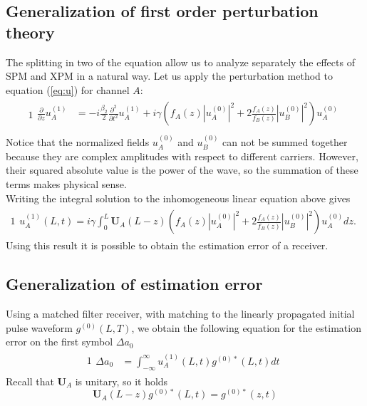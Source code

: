 \documentclass[10pt, lettersize, journal, onecolumn]{IEEEtran}
\begin{document}
\subsection{Generalization of first order perturbation theory}
The splitting in two of the equation allow us to analyze separately the effects of SPM and XPM in a natural way.
Let us apply the perturbation method to equation  (\ref{eq:u}) for channel $A$:
\begin{alignat}{1}
 \begin{aligned}
 \frac{\partial}{\partial z} u_A^{(1)} &= -  i \frac{\beta_2}{2} \frac{\partial^2}{\partial t^2} u_A^{(1)} + i \gamma \left(f_A(z)|u_A^{(0)}|^2 + 2 \frac{f_A(z)}{f_B(z)} |u_B^{(0)}|^2 \right)u_A^{(0)} \\
 \end{aligned}
\end{alignat} \label{eq:perturbation}
Notice that the normalized fields $u^{(0)}_A$ and $u^{(0)}_B$ can not be summed together because they are complex amplitudes with respect to different carriers. However, their squared absolute value is the power of the wave, so the summation of these terms makes physical sense.\\
Writing the integral solution to the inhomogeneous linear equation above gives
\begin{alignat}{1}
 \begin{aligned}
 u_A^{(1)}(L, t) = i\gamma \int_0^L \mathbf{U}_A(L-z)\left(f_A(z)|u_A^{(0)}|^2 + 2 \frac{f_A(z)}{f_B(z)} |u_B^{(0)}|^2 \right)u_A^{(0)} dz.
 \end{aligned}\label{eq:solution}
\end{alignat} 
Using this result it is possible to obtain the estimation error of a receiver.
\subsection{Generalization of estimation error}
Using a matched filter receiver, with matching to the linearly propagated initial pulse waveform $g^{(0)}(L, T)$, we obtain the following equation for the estimation error on the first symbol $\Delta a_0$ 
\begin{alignat}{1}
 \begin{aligned}
 \Delta a_0 &= \int_{-\infty}^{\infty} u_A^{(1)}(L, t) g^{(0)*}(L, t) dt
 \end{aligned}
\end{alignat} \label{eq:matched}
Recall that $\mathbf{U}_A$ is unitary, so it holds
\begin{equation}\label{eq:subs}
	\mathbf{U}_A(L-z) g^{(0)*}(L, t) = g^{(0)*}(z, t)
\end{equation}
\end{document}
